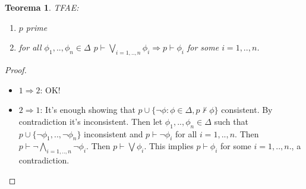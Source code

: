 \documentclass[11pt,a4paper]{article}
\newtheorem{theorem}{Teorema}
\theoremstyle{definition}
\theoremstyle{remark}
\begin{document}
\begin{theorem}

	TFAE:
	\begin{enumerate}
		\item	$p$ prime
		\item	for all $\phi_1,..,\phi_n \in \Delta$ $p \vdash \bigvee_{i=1,..,n} \phi_i \Rightarrow p \vdash \phi_i$ for some $i = 1,..,n$. 
	\end{enumerate}
 
\end{theorem}

\begin{proof}

	\begin{itemize}
		\item $1 \Rightarrow 2$: OK!
		\item $2 \Rightarrow 1$: It's enough showing that $p \cup \{\neg \phi: \phi \in \Delta, p \not \vdash \phi\}$ consistent.
			By contradiction it's inconsistent. Then let $\phi_1,..,\phi_n \in \Delta$ such that 
			$p \cup \{\neg \phi_1,..,\neg \phi_n\}$ inconsistent and $p \vdash \neg \phi_i$ for all $i = 1,..,n$.
			Then $p \vdash \neg \bigwedge_{i = 1,..,n} \neg \phi_i$.
			Then $p \vdash \bigvee \phi_i$. This implies $p \vdash \phi_i$ for some $i=1,..,n$., a contradiction.

	\end{itemize}

\end{proof}
\end{document}

